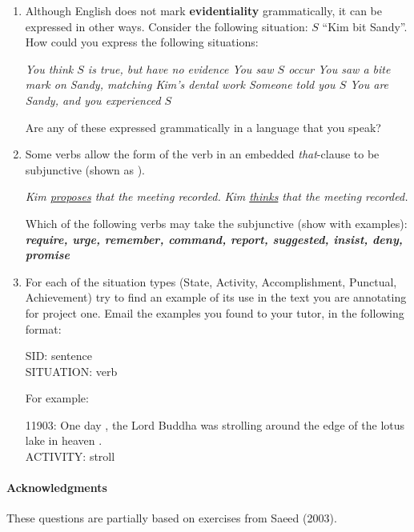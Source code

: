 \documentclass[a4paper]{article}
\newcommand{\lex}[1]{\textbf{\textit{#1}}}
\newcommand{\ix}{\ex\it}
\newcommand{\ul}[1]{\uline{#1}}
\newcommand{\ull}{\uuline}
\begin{document}
\begin{enumerate}
\item Although English does not mark \textbf{evidentiality} grammatically, it
  can be expressed in other ways.  Consider the following situation:
$S$ ``Kim bit Sandy''.  How could you express the following situations:
  \begin{exe}
    \ix You think $S$ is true, but have no evidence
    \ix You saw $S$ occur
    \ix You saw a bite mark on Sandy, matching Kim's dental work
    \ix Someone told you $S$
    \ix You are Sandy, and you experienced $S$ 
  \end{exe}
  Are any of these expressed grammatically in a language that you speak?
\item Some verbs allow the form of the verb in an embedded
  \textit{that}-clause to be subjunctive (shown as \ull{subjunctive form}).
  \begin{exe}
  \ex \textit{Kim \ul{proposes} that the meeting \ull{be} recorded.}
  \ex *\textit{Kim \ul{thinks} that the meeting \ull{be} recorded.}
  \end{exe}
  Which of the following verbs may take the subjunctive (show with
  examples): \\ \lex{require, urge, remember, command, report,
    suggested, insist, deny, promise}

\item For each of the situation types (State, Activity, Accomplishment, Punctual, Achievement)
  try to find an example of its use in the text you are
  annotating for project one.  
  Email the examples you found to your tutor, in the following format:
  \begin{flushleft}
    SID: sentence \\
    SITUATION: verb
  \end{flushleft}
   For example:
  \begin{flushleft}
    11903: One day , the Lord Buddha was strolling around the edge of the lotus lake in heaven .\\
    ACTIVITY: stroll
  \end{flushleft}
\end{enumerate}

\vfill
\paragraph{Acknowledgments} These questions are partially
based on exercises from Saeed (2003).
\end{document}
